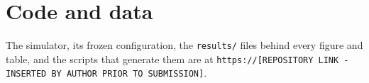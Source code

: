 \documentclass{article}
\begin{document}
%
\makeatletter
\if@anonymous\else
\section*{Code and data}
The simulator, its frozen configuration, the \texttt{results/} files behind every figure and
table, and the scripts that generate them are at
\texttt{https://[REPOSITORY LINK - INSERTED BY AUTHOR PRIOR TO SUBMISSION]}.
\fi
\makeatother
\end{document}
